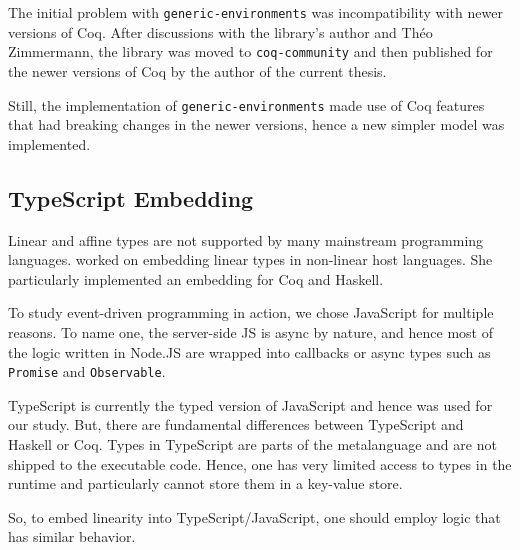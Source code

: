 The initial problem with \texttt{generic-environments} was incompatibility with newer versions of Coq. After discussions with the library's author and Th\'eo Zimmermann, the library was moved to \texttt{coq-community} and then published for the newer versions of Coq by the author of the current thesis.

Still, the implementation of \texttt{generic-environments} made use of Coq features that had breaking changes in the newer versions, hence a new simpler model was implemented.

\subsection{TypeScript Embedding}

Linear and affine types are not supported by many mainstream programming languages. \cite{JenniferPaykin2018} worked on embedding linear types in non-linear host languages. She particularly implemented an embedding for Coq and Haskell.

To study event-driven programming in action, we chose JavaScript for multiple reasons. To name one, the server-side JS is async by nature, and hence most of the logic written in Node.JS are wrapped into callbacks or async types such as \texttt{Promise} and \texttt{Observable}.

TypeScript is currently the typed version of JavaScript and hence was used for our study. But, there are fundamental differences between TypeScript and Haskell or Coq. Types in TypeScript are parts of the metalanguage and are not shipped to the executable code. Hence, one has very limited access to types in the runtime and particularly cannot store them in a key-value store.

So, to embed linearity into TypeScript/JavaScript, one should employ logic that has similar behavior.


